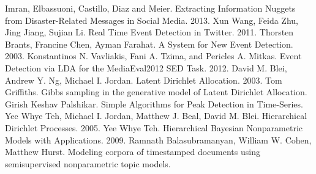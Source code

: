 \documentclass[12pt, a4paper]{article}
\begin{document}
\begin{thebibliography}{9}
	Imran, Elbassuoni, Castillo, Diaz and Meier.
	Extracting Information Nuggets from Disaster-Related Messages in Social Media.
	2013.
	Xun Wang, Feida Zhu, Jing Jiang, Sujian Li.
	Real Time Event Detection in Twitter.
	2011.
	Thorsten Brants, Francine Chen, Ayman Farahat.
	A System for New Event Detection.
	2003.
	Konstantinos N. Vavliakis, Fani A. Tzima, and Pericles A. Mitkas.	
	Event Detection via LDA for the MediaEval2012 SED Task.
	2012.
	David M. Blei, Andrew Y. Ng, Michael I. Jordan.
	Latent Dirichlet Allocation.
	2003.
	Tom Griffiths.
	Gibbs sampling in the generative model of Latent Dirichlet Allocation.
	Girish Keshav Palshikar.
	Simple Algorithms for Peak Detection in Time-Series.
	Yee Whye Teh, Michael I. Jordan, Matthew J. Beal, David M. Blei.
	Hierarchical Dirichlet Processes.
	2005.
	Yee Whye Teh.
	Hierarchical Bayesian Nonparametric Models with Applications.
	2009.
	Ramnath Balasubramanyan, William W. Cohen, Matthew Hurst.
	Modeling corpora of timestamped documents using semisupervised nonparametric topic models.
		
\end{thebibliography}
  
\end{document}
